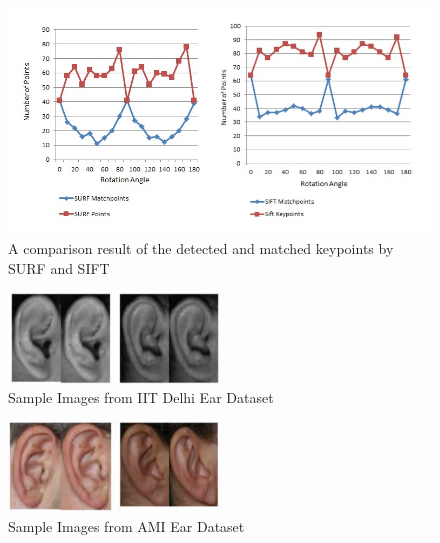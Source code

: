 \begin{figure}
		\includegraphics[width=\textwidth]{Figures/Figure17}
	\caption{A comparison result of the detected and matched keypoints by SURF and SIFT}
	\label{fig:Figure13}
\end{figure}

\begin{figure}
	\begin{center}
		\includegraphics[width=0.5\textwidth]{Figures/Figure13}
	\end{center}
	\caption{Sample Images from IIT Delhi Ear Dataset}
	\label{fig:Figure13}
\end{figure}

\begin{figure}
	\begin{center}
		\includegraphics[width=0.5\textwidth]{Figures/Figure14}
	\end{center}
	\caption{Sample Images from AMI Ear Dataset}
	\label{fig:Figure14}
\end{figure}